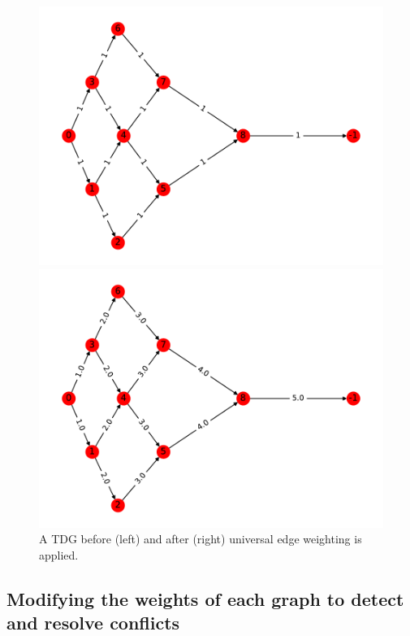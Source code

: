 \begin{figure}[H]
  \begin{minipage}[c]{0.5\textwidth}
    \centering
    \includegraphics[scale=0.5]{../../figures/G_pre_universal.pdf}
  \end{minipage}
  \begin{minipage}[c]{0.5\textwidth}
    \centering
    \includegraphics[scale=0.5]{../../figures/G_universal.pdf}
  \end{minipage}
  \caption{A TDG before (left) and after (right) universal edge weighting is applied.}
   \label{universal}
\end{figure}

\subsection{Modifying the weights of each graph to detect and resolve conflicts}\label{sec:conflict}


